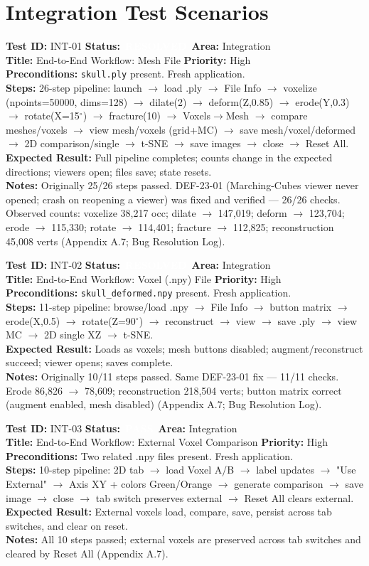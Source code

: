 \documentclass[12pt,a4paper]{article}
\newcommand{\statuspass}{\colorbox{statusgreen}{\textcolor{white}{\textbf{\,PASS\,}}}}
\newcommand{\statusresolved}{\colorbox{statusorange}{\textcolor{white}{\textbf{\,RESOLVED\,}}}}
\newcommand{\testcase}[9]{%
  \smallskip
  \noindent\textbf{Test ID:} #1 \hfill \textbf{Status:} #2 \hfill \textbf{Area:} #3 \\
  \textbf{Title:} #4 \hfill \textbf{Priority:} #5 \\[0.3em]
  \textbf{Preconditions:} #6 \\[0.3em]
  \textbf{Steps:} #7 \\[0.3em]
  \textbf{Expected Result:} #8 \\
  \textbf{Notes:} #9
  \smallskip
}
\begin{document}
\section{Integration Test Scenarios}

\testcase{INT-01}{\statusresolved}{Integration}{End-to-End Workflow: Mesh File}{High}{\texttt{skull.ply} present. Fresh application.}{26-step pipeline: launch $\rightarrow$ load .ply $\rightarrow$ File Info $\rightarrow$ voxelize (npoints=50000, dims=128) $\rightarrow$ dilate(2) $\rightarrow$ deform(Z,0.85) $\rightarrow$ erode(Y,0.3) $\rightarrow$ rotate(X=15$^\circ$) $\rightarrow$ fracture(10) $\rightarrow$ Voxels$\rightarrow$Mesh $\rightarrow$ compare meshes/voxels $\rightarrow$ view mesh/voxels (grid+MC) $\rightarrow$ save mesh/voxel/deformed $\rightarrow$ 2D comparison/single $\rightarrow$ t-SNE $\rightarrow$ save images $\rightarrow$ close $\rightarrow$ Reset All.}{Full pipeline completes; counts change in the expected directions; viewers open; files save; state resets.}{Originally 25/26 steps passed. DEF-23-01 (Marching-Cubes viewer never opened; crash on reopening a viewer) was fixed and verified --- 26/26 checks. Observed counts: voxelize 38,217 occ; dilate $\rightarrow$ 147,019; deform $\rightarrow$ 123,704; erode $\rightarrow$ 115,330; rotate $\rightarrow$ 114,401; fracture $\rightarrow$ 112,825; reconstruction 45,008 verts (Appendix A.7; Bug Resolution Log).}


\testcase{INT-02}{\statusresolved}{Integration}{End-to-End Workflow: Voxel (.npy) File}{High}{\texttt{skull\_deformed.npy} present. Fresh application.}{11-step pipeline: browse/load .npy $\rightarrow$ File Info $\rightarrow$ button matrix $\rightarrow$ erode(X,0.5) $\rightarrow$ rotate(Z=90$^\circ$) $\rightarrow$ reconstruct $\rightarrow$ view $\rightarrow$ save .ply $\rightarrow$ view MC $\rightarrow$ 2D single XZ $\rightarrow$ t-SNE.}{Loads as voxels; mesh buttons disabled; augment/reconstruct succeed; viewer opens; saves complete.}{Originally 10/11 steps passed. Same DEF-23-01 fix --- 11/11 checks. Erode 86,826 $\rightarrow$ 78,609; reconstruction 218,504 verts; button matrix correct (augment enabled, mesh disabled) (Appendix A.7; Bug Resolution Log).}


\testcase{INT-03}{\statuspass}{Integration}{End-to-End Workflow: External Voxel Comparison}{High}{Two related .npy files present. Fresh application.}{10-step pipeline: 2D tab $\rightarrow$ load Voxel A/B $\rightarrow$ label updates $\rightarrow$ "Use External" $\rightarrow$ Axis XY + colors Green/Orange $\rightarrow$ generate comparison $\rightarrow$ save image $\rightarrow$ close $\rightarrow$ tab switch preserves external $\rightarrow$ Reset All clears external.}{External voxels load, compare, save, persist across tab switches, and clear on reset.}{All 10 steps passed; external voxels are preserved across tab switches and cleared by Reset All (Appendix A.7).}
\end{document}
